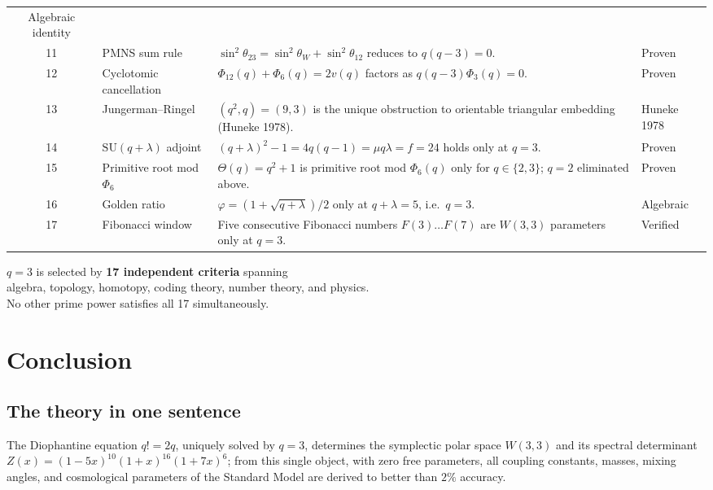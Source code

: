 \documentclass[12pt,a4paper]{article}
\theoremstyle{definition}
\newcommand{\SU}{\mathrm{SU}}
\newcommand{\Phithree}{\Phi_3}
\newcommand{\Phisix}{\Phi_6}
\begin{document}
\begin{center}
\begin{tabular}{clp{6.2cm}l}
  Algebraic identity \\[2pt]
11 & PMNS sum rule &
  $\sin^2\theta_{23}=\sin^2\theta_W+\sin^2\theta_{12}$ reduces to
  $q(q-3)=0$. &
  Proven \\[2pt]
12 & Cyclotomic cancellation &
  $\Phi_{12}(q)+\Phisix(q)=2v(q)$ factors as $q(q-3)\Phithree(q)=0$. &
  Proven \\[2pt]
13 & Jungerman--Ringel &
  $(q^2,q)=(9,3)$ is the unique obstruction to orientable triangular
  embedding (Huneke 1978). &
  Huneke 1978 \\[2pt]
14 & $\SU(q+\lambda)$ adjoint &
  $(q+\lambda)^2-1=4q(q-1)=\mu q\lambda=f=24$ holds only at $q=3$. &
  Proven \\[2pt]
15 & Primitive root mod $\Phisix$ &
  $\Theta(q)=q^2+1$ is primitive root mod $\Phisix(q)$ only for
  $q\in\{2,3\}$; $q=2$ eliminated above. &
  Proven \\[2pt]
16 & Golden ratio &
  $\varphi=(1+\sqrt{q+\lambda})/2$ only at $q+\lambda=5$, i.e.\ $q=3$. &
  Algebraic \\[2pt]
17 & Fibonacci window &
  Five consecutive Fibonacci numbers $F(3)\ldots F(7)$ are
  $W(3,3)$ parameters only at $q=3$. &
  Verified \\[2pt]
\hline
\end{tabular}
\end{center}

\begin{tcolorbox}[colback=green!5!white,colframe=green!50!black]
\centering
$q=3$ is selected by \textbf{17 independent criteria} spanning\\
algebra, topology, homotopy, coding theory, number theory, and physics.\\[4pt]
No other prime power satisfies all 17 simultaneously.
\end{tcolorbox}


\section{Conclusion}
\label{sec:conclusion}

\subsection{The theory in one sentence}

The Diophantine equation $q!=2q$, uniquely solved by $q=3$, determines
the symplectic polar space $W(3,3)$ and its spectral determinant
$Z(x)=(1-5x)^{10}(1+x)^{16}(1+7x)^{6}$; from this single object,
with zero free parameters, all coupling constants, masses, mixing
angles, and cosmological parameters of the Standard Model are derived
to better than $2\%$ accuracy.
\end{document}
